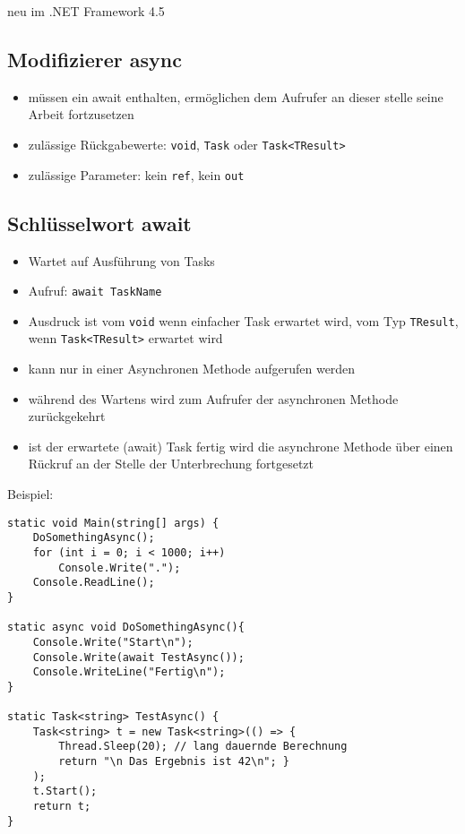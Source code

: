 neu im .NET Framework 4.5

\subsection{Modifizierer async}

\begin{itemize}
\item müssen ein await enthalten, ermöglichen dem Aufrufer an dieser stelle seine Arbeit fortzusetzen
\item zulässige Rückgabewerte: \lstinline$void$, \lstinline$Task$ oder \lstinline$Task<TResult>$
\item zulässige Parameter: kein \lstinline$ref$, kein \lstinline$out$
\end{itemize}

\subsection{Schlüsselwort await}

\begin{itemize}
\item Wartet auf Ausführung von Tasks
\item Aufruf: \lstinline$await TaskName$
\item Ausdruck ist vom \lstinline`void` wenn einfacher Task erwartet wird, vom Typ \lstinline`TResult`, wenn \lstinline`Task<TResult>` erwartet wird
\item kann nur in einer Asynchronen Methode aufgerufen werden
\item während des Wartens wird zum Aufrufer der asynchronen Methode zurückgekehrt
\item ist der erwartete (await) Task fertig wird die asynchrone Methode über einen Rückruf an der Stelle der Unterbrechung fortgesetzt
\end{itemize}
Beispiel:
\begin{lstlisting}[language={[Sharp]C}]
static void Main(string[] args) { 
	DoSomethingAsync(); 
	for (int i = 0; i < 1000; i++)
		Console.Write(".");
	Console.ReadLine(); 
} 

static async void DoSomethingAsync(){ 
	Console.Write("Start\n"); 
	Console.Write(await TestAsync());
	Console.WriteLine("Fertig\n"); 
} 

static Task<string> TestAsync() { 
	Task<string> t = new Task<string>(() => { 
		Thread.Sleep(20); // lang dauernde Berechnung 
		return "\n Das Ergebnis ist 42\n"; }
	); 
	t.Start(); 
	return t; 
}
\end{lstlisting}

